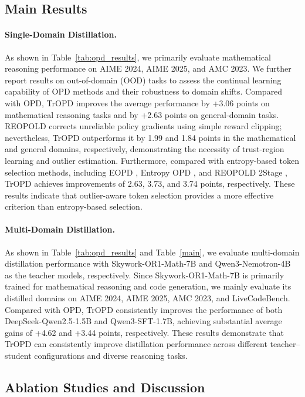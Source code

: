 \documentclass{llmxive}
\providecommand{\cite}[1]{\citep{#1}}
\begin{document}
\subsection{Main Results}

\paragraph{Single-Domain Distillation.}
As shown in Table~\ref{tab:opd_results}, we primarily evaluate mathematical reasoning performance on AIME 2024, AIME 2025, and AMC 2023. We further report results on out-of-domain (OOD) tasks to assess the continual learning capability of OPD methods and their robustness to domain shifts. Compared with OPD, TrOPD improves the average performance by +3.06 points on mathematical reasoning tasks and by +2.63 points on general-domain tasks. REOPOLD corrects unreliable policy gradients using simple reward clipping; nevertheless, TrOPD outperforms it by 1.99 and 1.84 points in the mathematical and general domains, respectively, demonstrating the necessity of trust-region learning and outlier estimation. Furthermore, compared with entropy-based token selection methods, including EOPD \cite{jin2026entropy}, Entropy OPD \cite{ko2026scaling, wang2026beyond}, and REOPOLD 2Stage \cite{ko2026scaling}, TrOPD achieves improvements of 2.63, 3.73, and 3.74 points, respectively. These results indicate that outlier-aware token selection provides a more effective criterion than entropy-based selection.


\paragraph{Multi-Domain Distillation.}
As shown in Table~\ref{tab:opd_results} and Table~\ref{main}, we evaluate multi-domain distillation performance with Skywork-OR1-Math-7B and Qwen3-Nemotron-4B as the teacher models, respectively. Since Skywork-OR1-Math-7B is primarily trained for mathematical reasoning and code generation, we mainly evaluate its distilled domains on AIME 2024, AIME 2025, AMC 2023, and LiveCodeBench. Compared with OPD, TrOPD consistently improves the performance of both DeepSeek-Qwen2.5-1.5B and Qwen3-SFT-1.7B, achieving substantial average gains of +4.62 and +3.44 points, respectively. These results demonstrate that TrOPD can consistently improve distillation performance across different teacher--student configurations and diverse reasoning tasks.



\subsection{Ablation Studies and Discussion}
\end{document}
